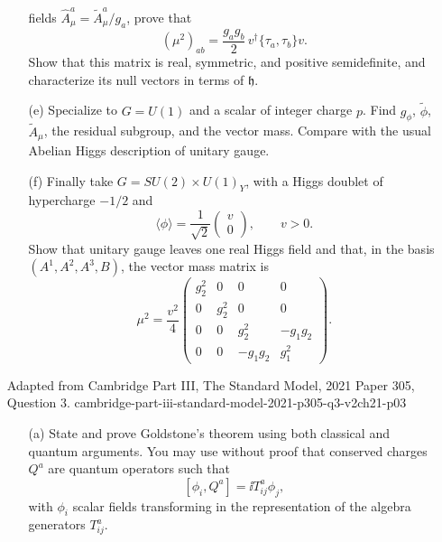 \begin{enumerate}
\begin{enumerate}
    fields \(\widehat A_\mu^a=\widetilde A_\mu^a/g_a\), prove that
    \[
      (\mu^2)_{ab}=\frac{g_ag_b}{2}\,
        v^\dagger\{\tau_a,\tau_b\}v .
    \]
    Show that this matrix is real, symmetric, and positive semidefinite,
    and characterize its null vectors in terms of \(\mathfrak h\).
    \item[(e)]
    Specialize to \(G=U(1)\) and a scalar of integer charge \(p\).  Find
    \(g_\phi\), \(\widetilde\phi\), \(\widetilde A_\mu\), the residual
    subgroup, and the vector mass.  Compare with the usual Abelian Higgs
    description of unitary gauge.
    \item[(f)]
    Finally take \(G=SU(2)\times U(1)_Y\), with a Higgs doublet of
    hypercharge \(-1/2\) and
    \[
      \langle\phi\rangle=\frac1{\sqrt2}
        \begin{pmatrix}v\\0\end{pmatrix},\qquad v>0 .
    \]
    Show that unitary gauge leaves one real Higgs field and that, in the
    basis \((A^1,A^2,A^3,B)\), the vector mass matrix is
    \[
      \mu^2=\frac{v^2}{4}
      \begin{pmatrix}
        g_2^2&0&0&0\\
        0&g_2^2&0&0\\
        0&0&g_2^2&-g_1g_2\\
        0&0&-g_1g_2&g_1^2
      \end{pmatrix}.
    \]
  \end{enumerate}

  {Adapted from Cambridge Part III, The Standard Model, 2021 Paper 305,
  Question 3.}
  {cambridge-part-iii-standard-model-2021-p305-q3-v2ch21-p03}
  \begin{enumerate}
    \item[(a)]
    State and prove Goldstone's theorem using both classical and quantum
    arguments.  You may use without proof that conserved charges \(Q^a\)
    are quantum operators such that
    \[
      [\phi_i,Q^a]=\ii T^a_{ij}\phi_j,
    \]
    with \(\phi_i\) scalar fields transforming in the representation of
    the algebra generators \(T^a_{ij}\).


\end{enumerate}
\end{enumerate}
